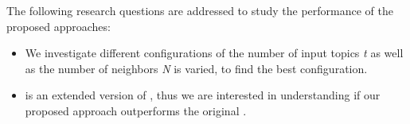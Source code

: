 The following research questions are addressed to study the performance of the proposed approaches:

\begin{itemize}
	\item \rqfirst We investigate different configurations of \TF\ie the 
	number of input topics \emph{t} as well as the number of neighbors \emph{N} 
	is varied, to find the best configuration. %
	
	\item \rqsecond \TFb is an extended version of \MNB, thus we are interested 
	in understanding if our proposed approach outperforms the original \MNB. 
\end{itemize}




